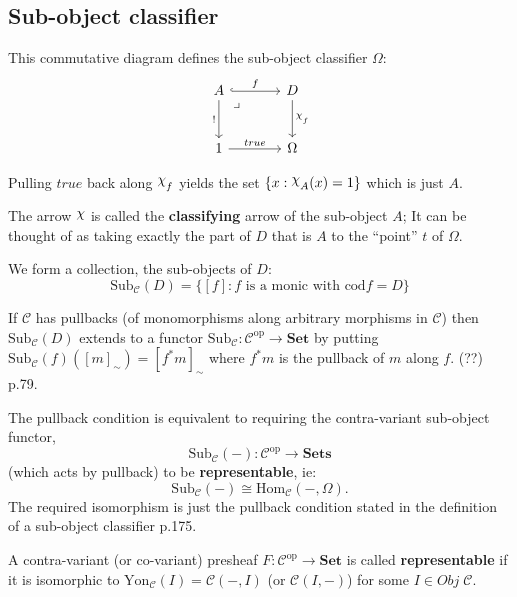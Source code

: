 \documentclass[12pt, orivec]{article}
\newcommand{\Chi}{\raisebox{2.5pt}{$\chi$}}
\begin{document}
\subsection{Sub-object classifier}

This commutative diagram defines the sub-object classifier $\Omega$:
\begin{equation}
\begin{tikzcd}[column sep = large, row sep = large]
A \arrow[r, hook, "f"] \arrow[d, swap, "!"]  \arrow[dr, phantom, "\lrcorner", very near start]
	& D \arrow[d, "\Chi_f"] \\
1 \arrow[r, "true"] & \Omega
\end{tikzcd}
\end{equation}

Pulling $true$ back along $\Chi_f$ yields the set $\{ x: \Chi_A(x) = 1 \}$ which is just $A$.

The arrow $\Chi$ is called the \textbf{classifying} arrow of the sub-object $A$;  It can be thought of as taking exactly the part of $D$ that is $A$ to the ``point'' $t$ of $\Omega$.

We form a collection, the sub-objects of $D$:
\begin{equation}
\mathrm{Sub}_{\mathscr{C}}(D) = \{ [f]: f \mbox{ is a monic with } \mathrm{cod} f = D \}
\end{equation}

If $\mathscr{C}$ has pullbacks (of monomorphisms along arbitrary morphisms in $\mathscr{C}$) then $\mathrm{Sub}_{\mathscr{C}}(D)$ extends to a functor $\mathrm{Sub}_{\mathscr{C}}: \mathscr{C}^{\mathrm{op}} \rightarrow \mathbf{Set}$ by putting $\mathrm{Sub}_{\mathscr{C}}(f)([m]_\sim) = [f^* m]_\sim$  where $f^* m$ is the pullback of $m$ along $f$. {\color{red}(??)} \parencite{Streicher2006} p.79.

The pullback condition is equivalent to requiring the contra-variant sub-object functor,
\begin{equation}
\mathrm{Sub}_{\mathscr{C}}(-): \mathscr{C}^{\mathrm{op}} \rightarrow \mathbf{Sets}
\end{equation}
(which acts by pullback) to be \textbf{representable}, ie:
\begin{equation}
\mathrm{Sub}_{\mathscr{C}}(-) \cong  \mathrm{Hom}_{\mathscr{C}}(-, \Omega).
\end{equation}
The required isomorphism is just the pullback condition stated in the definition of a sub-object classifier \parencite{Awodey2006} p.175.

A contra-variant (or co-variant) presheaf $F: \mathscr{C}^{\mathrm{op}} \rightarrow \mathbf{Set}$ is called \textbf{representable} if it is isomorphic to $\mathrm{Yon}_{\mathscr{C}}(I) = \mathscr{C}(-, I)$ (or $\mathscr{C}(I, -)$) for some $I \in Obj \; \mathscr{C}$.
\end{document}
